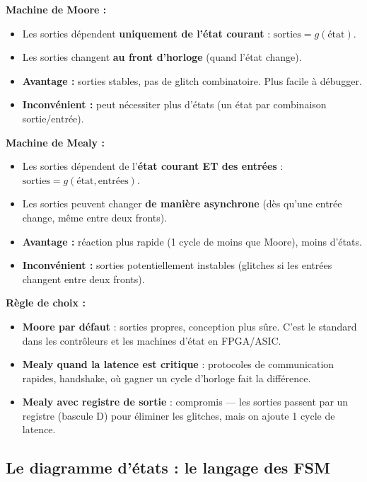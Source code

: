 \documentclass[12pt,a4paper,twoside]{book}
\begin{document}
\begin{formule}
\textbf{Machine de Moore :}
\begin{itemize}[nosep]
\item Les sorties dépendent \textbf{uniquement de l'état courant} : $\text{sorties} = g(\text{état})$.
\item Les sorties changent \textbf{au front d'horloge} (quand l'état change).
\item \textbf{Avantage :} sorties stables, pas de glitch combinatoire. Plus facile à débugger.
\item \textbf{Inconvénient :} peut nécessiter plus d'états (un état par combinaison sortie/entrée).
\end{itemize}

\textbf{Machine de Mealy :}
\begin{itemize}[nosep]
\item Les sorties dépendent de l'\textbf{état courant ET des entrées} : $\text{sorties} = g(\text{état}, \text{entrées})$.
\item Les sorties peuvent changer \textbf{de manière asynchrone} (dès qu'une entrée change, même entre deux fronts).
\item \textbf{Avantage :} réaction plus rapide (1 cycle de moins que Moore), moins d'états.
\item \textbf{Inconvénient :} sorties potentiellement instables (glitches si les entrées changent entre deux fronts).
\end{itemize}
\end{formule}

\begin{pratique}
\textbf{Règle de choix :}
\begin{itemize}[nosep]
\item \textbf{Moore par défaut} : sorties propres, conception plus sûre. C'est le standard dans les contrôleurs et les machines d'état en FPGA/ASIC.
\item \textbf{Mealy quand la latence est critique} : protocoles de communication rapides, handshake, où gagner un cycle d'horloge fait la différence.
\item \textbf{Mealy avec registre de sortie} : compromis --- les sorties passent par un registre (bascule D) pour éliminer les glitches, mais on ajoute 1 cycle de latence.
\end{itemize}
\end{pratique}

\subsection{Le diagramme d'états : le langage des FSM}
\end{document}
